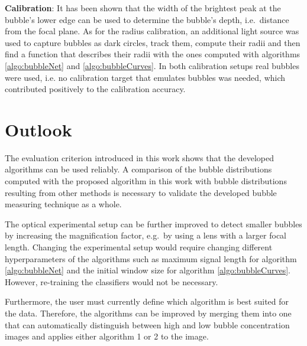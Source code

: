 \textbf{Calibration}: It has been shown that the width of the brightest peak at the bubble's lower edge can be used to determine the bubble's depth, i.e.\ distance from the focal plane. As for the radius calibration, an additional light source was used to capture bubbles as dark circles, track them, compute their radii and then find a function that describes their radii with the ones computed with algorithms \ref{algo:bubbleNet} and \ref{algo:bubbleCurves}. In both calibration setups real bubbles were used, i.e. no calibration target that emulates bubbles was needed, which contributed positively to the calibration accuracy. 

\section{Outlook}
The evaluation criterion introduced in this work shows that the developed algorithms can be used reliably. A comparison of the bubble distributions computed with the proposed algorithm in this work with bubble distributions resulting from other methods is necessary to validate the developed bubble measuring technique as a whole. 

The optical experimental setup can be further improved to detect smaller bubbles by increasing the magnification factor, e.g.\ by using a lens with a larger focal length. Changing the experimental setup would require changing different hyperparameters of the algorithms such as maximum signal length for algorithm \ref{algo:bubbleNet} and the initial window size for algorithm \ref{algo:bubbleCurves}. However, re-training the classifiers would not be necessary. 

Furthermore, the user must currently define which algorithm is best suited for the data. Therefore, the algorithms can be improved by merging them into one that can automatically distinguish between high and low bubble concentration images and applies either algorithm 1 or 2 to the image. 
























